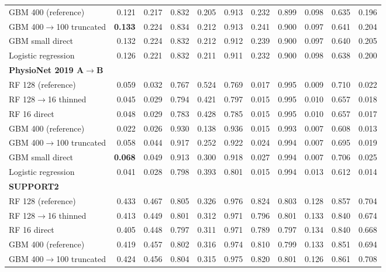 {\begin{longtable}{lrrrrrrrrrr}
\quad GBM 400 (reference) & 0.121 & 0.217 & 0.832 & 0.205 & 0.913 & 0.232 & 0.899 & 0.098 & 0.635 & 0.196 \\
\quad GBM 400$\rightarrow$100 truncated & \textbf{0.133} & 0.224 & 0.834 & 0.212 & 0.913 & 0.241 & 0.900 & 0.097 & 0.641 & 0.204 \\
\quad GBM small direct & 0.132 & 0.224 & 0.832 & 0.212 & 0.912 & 0.239 & 0.900 & 0.097 & 0.640 & 0.205 \\
\quad Logistic regression & 0.126 & 0.221 & 0.832 & 0.211 & 0.911 & 0.232 & 0.900 & 0.098 & 0.638 & 0.200 \\
\midrule
\multicolumn{11}{l}{\textbf{PhysioNet 2019 A$\rightarrow$B}} \\*
\quad RF 128 (reference) & 0.059 & 0.032 & 0.767 & 0.524 & 0.769 & 0.017 & 0.995 & 0.009 & 0.710 & 0.022 \\
\quad RF 128$\rightarrow$16 thinned & 0.045 & 0.029 & 0.794 & 0.421 & 0.797 & 0.015 & 0.995 & 0.010 & 0.657 & 0.018 \\
\quad RF 16 direct & 0.048 & 0.029 & 0.783 & 0.428 & 0.785 & 0.015 & 0.995 & 0.010 & 0.657 & 0.017 \\
\quad GBM 400 (reference) & 0.022 & 0.026 & 0.930 & 0.138 & 0.936 & 0.015 & 0.993 & 0.007 & 0.608 & 0.013 \\
\quad GBM 400$\rightarrow$100 truncated & 0.058 & 0.044 & 0.917 & 0.252 & 0.922 & 0.024 & 0.994 & 0.007 & 0.695 & 0.019 \\
\quad GBM small direct & \textbf{0.068} & 0.049 & 0.913 & 0.300 & 0.918 & 0.027 & 0.994 & 0.007 & 0.706 & 0.025 \\
\quad Logistic regression & 0.041 & 0.028 & 0.798 & 0.393 & 0.801 & 0.015 & 0.994 & 0.013 & 0.612 & 0.014 \\
\midrule
\multicolumn{11}{l}{\textbf{SUPPORT2}} \\*
\quad RF 128 (reference) & 0.433 & 0.467 & 0.805 & 0.326 & 0.976 & 0.824 & 0.803 & 0.128 & 0.857 & 0.704 \\
\quad RF 128$\rightarrow$16 thinned & 0.413 & 0.449 & 0.801 & 0.312 & 0.971 & 0.796 & 0.801 & 0.133 & 0.840 & 0.674 \\
\quad RF 16 direct & 0.405 & 0.448 & 0.797 & 0.311 & 0.971 & 0.789 & 0.797 & 0.134 & 0.840 & 0.668 \\
\quad GBM 400 (reference) & 0.419 & 0.457 & 0.802 & 0.316 & 0.974 & 0.810 & 0.799 & 0.133 & 0.851 & 0.694 \\
\quad GBM 400$\rightarrow$100 truncated & 0.424 & 0.456 & 0.804 & 0.315 & 0.975 & 0.820 & 0.801 & 0.126 & 0.861 & 0.708 \\

\end{longtable}}
